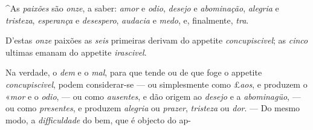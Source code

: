 
 
\textasciicircum{}As \emph{paixões} são \emph{onze}, a saber: \emph{amor} e \emph{odio}, \emph{desejo} e \emph{abominação}, \emph{alegria} e \emph{tristeza}, \emph{esperança} e \emph{desespero}, \emph{audacia} e \emph{medo}, e, finalmente, \emph{tra}.

D'estas \emph{onze} paixões as \emph{seis} primeiras derivam do appetite \emph{concupiscivel}; as \emph{cinco} ultimas emanam do appetite \emph{irascivel}.

Na verdade, o \emph{dem} e o \emph{mal}, para que tende ou de que foge o appetite \emph{concupiscivel}, podem considerar-se --- ou simplesmente como £\emph{aos}, e produzem o «\emph{mor} e o \emph{odio}, --- ou como \emph{ausentes}, e dão origem ao \emph{desejo} e a \emph{abominagüo}, --- ou como \emph{presentes}, e produzem \emph{alegria} ou \emph{prazer}, \emph{tristeza} ou \emph{dor}. --- Do mesmo modo, a \emph{difficuldade} do bem, que é objecto do ap-

